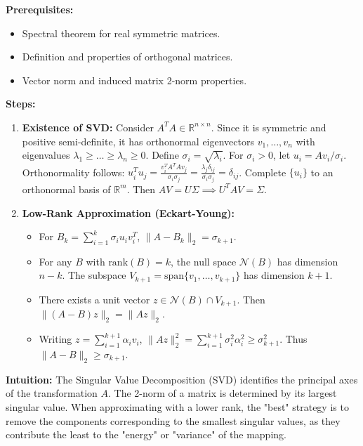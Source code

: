 \begin{solution}
\textbf{Prerequisites:}
\begin{itemize}
    \item Spectral theorem for real symmetric matrices.
    \item Definition and properties of orthogonal matrices.
    \item Vector norm and induced matrix 2-norm properties.
\end{itemize}

\textbf{Steps:}
\begin{enumerate}
    \item \textbf{Existence of SVD:} Consider $A^T A \in \mathbb{R}^{n \times n}$. Since it is symmetric and positive semi-definite, it has orthonormal eigenvectors $v_1, \dots, v_n$ with eigenvalues $\lambda_1 \geq \dots \geq \lambda_n \geq 0$. Define $\sigma_i = \sqrt{\lambda_i}$. For $\sigma_i > 0$, let $u_i = A v_i / \sigma_i$. Orthonormality follows: $u_i^T u_j = \frac{v_i^T A^T A v_j}{\sigma_i \sigma_j} = \frac{\lambda_j \delta_{ij}}{\sigma_i \sigma_j} = \delta_{ij}$. Complete $\{u_i\}$ to an orthonormal basis of $\mathbb{R}^m$. Then $A V = U \Sigma \implies U^T A V = \Sigma$.

    \item \textbf{Low-Rank Approximation (Eckart-Young):}
    \begin{itemize}
        \item For $B_k = \sum_{i=1}^k \sigma_i u_i v_i^T$, $\| A - B_k \|_2 = \sigma_{k+1}$.
        \item For any $B$ with $\text{rank}(B) = k$, the null space $\mathcal{N}(B)$ has dimension $n-k$. The subspace $V_{k+1} = \text{span}\{v_1, \dots, v_{k+1}\}$ has dimension $k+1$.
        \item There exists a unit vector $z \in \mathcal{N}(B) \cap V_{k+1}$. Then $\|(A-B)z\|_2 = \|Az\|_2$.
        \item Writing $z = \sum_{i=1}^{k+1} \alpha_i v_i$, $\|Az\|_2^2 = \sum_{i=1}^{k+1} \sigma_i^2 \alpha_i^2 \geq \sigma_{k+1}^2$. Thus $\|A-B\|_2 \geq \sigma_{k+1}$.
    \end{itemize}
\end{enumerate}

\textbf{Intuition:}
The Singular Value Decomposition (SVD) identifies the principal axes of the transformation $A$. The 2-norm of a matrix is determined by its largest singular value. When approximating with a lower rank, the "best" strategy is to remove the components corresponding to the smallest singular values, as they contribute the least to the "energy" or "variance" of the mapping.
\end{solution}

